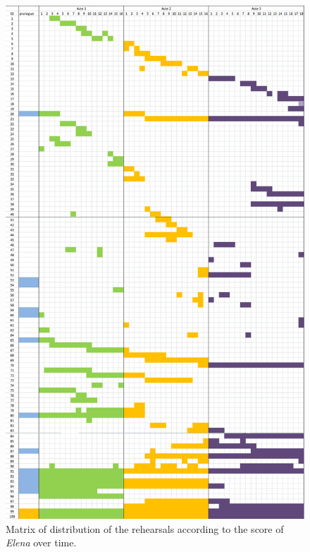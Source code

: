 \documentclass[conference]{IEEEtran}
\newcommand{\todo}[1]{\noindent\textcolor{red}{{\bf \{ToDo} #1{\bf \}}}}
\begin{document}
\begin{figure}[htb!]
  \centering
  \includegraphics[width=\columnwidth]{elenamatrix}
  \caption{Matrix of distribution of the rehearsals according to the score of \emph{Elena} over time.} 
  \label{fig:elenamatrix}
\end{figure}

\end{document}
